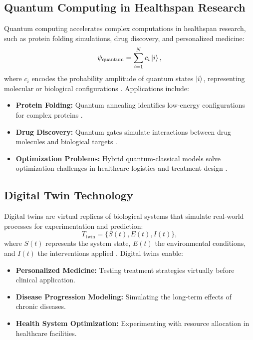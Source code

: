 \documentclass{article}
\theoremstyle{plain}
\begin{document}
\subsection{Quantum Computing in Healthspan Research}
Quantum computing accelerates complex computations in healthspan research, such as protein folding simulations, drug discovery, and personalized medicine:
\begin{equation}
\psi_{\text{quantum}} = \sum_{i=1}^{N} c_i \ket{i},
\end{equation}
where $c_i$ encodes the probability amplitude of quantum states $\ket{i}$, representing molecular or biological configurations \cite{quantumHealth2023}. Applications include:
\begin{itemize}
    \item \textbf{Protein Folding:} Quantum annealing identifies low-energy configurations for complex proteins \cite{proteinFoldingQuantum2022}.
    \item \textbf{Drug Discovery:} Quantum gates simulate interactions between drug molecules and biological targets \cite{quantumDrugDiscovery2023}.
    \item \textbf{Optimization Problems:} Hybrid quantum-classical models solve optimization challenges in healthcare logistics and treatment design \cite{quantumOptimization2023}.
\end{itemize}

\subsection{Digital Twin Technology}
Digital twins are virtual replicas of biological systems that simulate real-world processes for experimentation and prediction:
\begin{equation}
T_{\text{twin}} = \{S(t), E(t), I(t)\},
\end{equation}
where $S(t)$ represents the system state, $E(t)$ the environmental conditions, and $I(t)$ the interventions applied \cite{digitalTwins2023}. Digital twins enable:
\begin{itemize}
    \item \textbf{Personalized Medicine:} Testing treatment strategies virtually before clinical application.
    \item \textbf{Disease Progression Modeling:} Simulating the long-term effects of chronic diseases.
    \item \textbf{Health System Optimization:} Experimenting with resource allocation in healthcare facilities.
\end{itemize}
\end{document}
